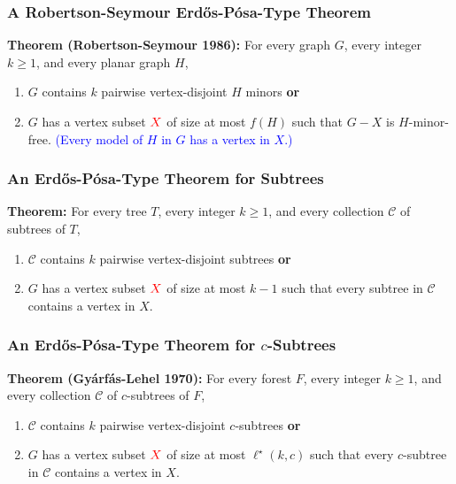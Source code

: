\documentclass{beamer}
\begin{document}
\begin{frame}
  \frametitle{A Robertson-Seymour Erdős-Pósa-Type Theorem}

  \noindent\textbf{Theorem (Robertson-Seymour 1986):} For every graph $G$, every integer $k\ge 1$,  and every planar graph $H$,
  \begin{enumerate}%
    \item $G$ contains $k$ pairwise vertex-disjoint $H$ minors \textbf{or}
    \item $G$ has a vertex subset $\mathcolor{red}{X}$ of size at most $f(H)$ such that $G-X$ is $H$-minor-free. \textcolor{blue}{(Every model of $H$ in $G$ has a vertex in $X$.)}
  \end{enumerate}
\end{frame}


\begin{frame}
  \frametitle{An Erdős-Pósa-Type Theorem for Subtrees}


  \noindent\textbf{Theorem:} For every tree $T$, every integer $k\ge 1$,  and every collection $\mathcal{C}$ of subtrees of $T$,
  \begin{enumerate}%
    \item $\mathcal{C}$ contains $k$ pairwise vertex-disjoint subtrees \textbf{or}
    \item $G$ has a vertex subset $\mathcolor{red}{X}$ of size at most $k-1$ such that every subtree in $\mathcal{C}$ contains a vertex in $X$.
  \end{enumerate}
\end{frame}


\begin{frame}
  \frametitle{An Erdős-Pósa-Type Theorem for $c$-Subtrees}


  \noindent\textbf{Theorem (Gyárfás-Lehel 1970):} For every forest $F$, every integer $k\ge 1$, and every collection $\mathcal{C}$ of $c$-subtrees of $F$,
  \begin{enumerate}%
    \item $\mathcal{C}$ contains $k$ pairwise vertex-disjoint $c$-subtrees \textbf{or}
    \item $G$ has a vertex subset $\mathcolor{red}{X}$ of size at most $\ell^\star(k,c)$ such that every $c$-subtree in $\mathcal{C}$ contains a vertex in $X$.
  \end{enumerate}
\end{frame}
\end{document}
